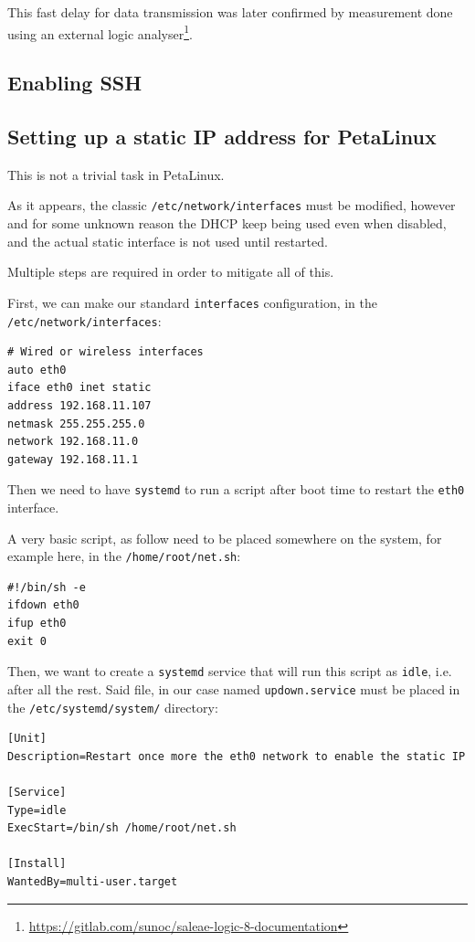 \documentclass[10pt]{article}
\begin{document}
This fast delay for data transmission was later confirmed by measurement done using an external logic analyser\footnote{\url{https://gitlab.com/sunoc/saleae-logic-8-documentation}}.

\subsection{Enabling SSH}
\label{sec:org5cc802b}
\subsection{Setting up a static IP address for PetaLinux}
\label{sec:org29fab8d}
This is not a trivial task in PetaLinux.

As it appears, the classic \texttt{/etc/network/interfaces} must be modified, however and
for some unknown reason the DHCP keep being used even when disabled, and the
actual static interface is not used until restarted.

Multiple steps are required in order to mitigate all of this.

First, we can make our standard \texttt{interfaces} configuration, in the  \texttt{/etc/network/interfaces}:
\begin{verbatim}
# Wired or wireless interfaces
auto eth0
iface eth0 inet static
address 192.168.11.107
netmask 255.255.255.0
network 192.168.11.0
gateway 192.168.11.1
\end{verbatim}

Then we need to have \texttt{systemd} to run a script after boot time to restart the \texttt{eth0} interface.

A very basic script, as follow need to be placed somewhere on the system, for example here, in the \texttt{/home/root/net.sh}:
\begin{verbatim}
#!/bin/sh -e
ifdown eth0
ifup eth0
exit 0
\end{verbatim}

Then, we want to create a \texttt{systemd} service that will run this script as \texttt{idle},
i.e. after all the rest. Said file, in our case named \texttt{updown.service} must be
placed in the \texttt{/etc/systemd/system/} directory:
\begin{verbatim}
[Unit]
Description=Restart once more the eth0 network to enable the static IP

[Service]
Type=idle
ExecStart=/bin/sh /home/root/net.sh

[Install]
WantedBy=multi-user.target
\end{verbatim}
\end{document}
